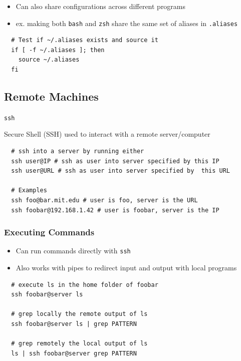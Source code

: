 \documentclass[letterpaper,12pt]{article}
\newcommand*{\lstitem}[1]{
  \setbox0\hbox{\lstinline{#1}}
  \item[\usebox0]
}
\begin{document}
\begin{itemize}
  \item Can also share configurations across different programs
  \item ex. making both \lstinline{bash} and \lstinline{zsh} share the same set of aliases in \lstinline{.aliases}
\end{itemize}

\begin{lstlisting}
  # Test if ~/.aliases exists and source it
  if [ -f ~/.aliases ]; then
    source ~/.aliases
  fi
\end{lstlisting}

\subsection{Remote Machines}

\begin{description}
  \lstitem{ssh} Secure Shell (SSH) used to interact with a remote server/computer
\end{description}

\begin{lstlisting}
  # ssh into a server by running either
  ssh user@IP # ssh as user into server specified by this IP
  ssh user@URL # ssh as user into server specified by  this URL

  # Examples
  ssh foo@bar.mit.edu # user is foo, server is the URL
  ssh foobar@192.168.1.42 # user is foobar, server is the IP
\end{lstlisting}

\subsubsection{Executing Commands}
\begin{itemize}
  \item Can run commands directly with \lstinline{ssh}
  \item Also works with pipes to redirect input and output with local programs
\end{itemize}

\begin{lstlisting}
  # execute ls in the home folder of foobar
  ssh foobar@server ls

  # grep locally the remote output of ls
  ssh foobar@server ls | grep PATTERN

  # grep remotely the local output of ls
  ls | ssh foobar@server grep PATTERN
\end{lstlisting}
\end{document}
